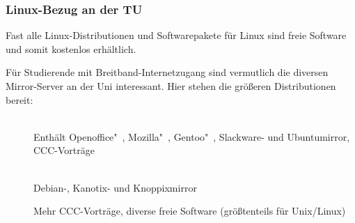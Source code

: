 	\subsubsection{Linux-Bezug an der TU}
		Fast alle Linux-Distributionen und Softwarepakete für Linux sind freie Software und somit kostenlos erhältlich.

		Für Studierende mit Breitband-Internetzugang sind vermutlich die diversen Mirror-Server an der Uni interessant. Hier stehen die größeren Distributionen bereit:

		\begin{description}
			\item[]~\\Enthält Openoffice"~, Mozilla"~, Gentoo"~, Slackware- und Ubuntumirror, CCC-Vorträge
			\item[]~\\Debian-, Kanotix- und Knoppixmirror
			\item[] Mehr CCC-Vorträge, diverse freie Software (größtenteils für Unix/Linux)
		\end{description}

